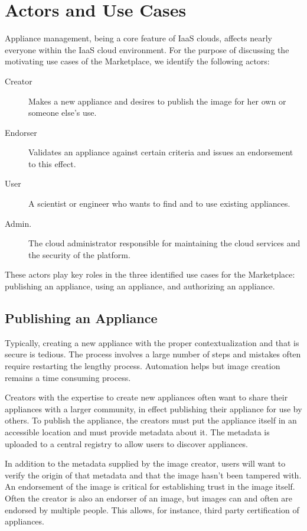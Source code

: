 \section{Actors and Use Cases}
\label{sec:usecases}

Appliance management, being a core feature of IaaS clouds, affects
nearly everyone within the IaaS cloud environment.  For the purpose of
discussing the motivating use cases of the Marketplace, we identify
the following actors:
\begin{description}
\item[Creator] Makes a new appliance and desires to publish the image
  for her own or someone else's use.
\item[Endorser] Validates an appliance against certain criteria and
  issues an endorsement to this effect.
\item[User] A scientist or engineer who wants to find and to use
  existing appliances.
\item[Admin.] The cloud administrator responsible for
  maintaining the cloud services and the security of the platform.
\end{description}
These actors play key roles in the three identified use cases for the
Marketplace: publishing an appliance, using an appliance, and
authorizing an appliance. 

\subsection{Publishing an Appliance}

Typically, creating a new appliance with the proper contextualization
and that is secure is tedious.  The process involves a large number of
steps and mistakes often require restarting the lengthy process.
Automation helps but image creation remains a time consuming process.

Creators with the expertise to create new appliances often want to
share their appliances with a larger community, in effect publishing
their appliance for use by others.  To publish the appliance, the
creators must put the appliance itself in an accessible location and
must provide metadata about it.  The metadata is uploaded to a central
registry to allow users to discover appliances. 

In addition to the metadata supplied by the image creator, users will
want to verify the origin of that metadata and that the image hasn't
been tampered with.  An endorsement of the image is critical for
establishing trust in the image itself.  Often the creator is also an
endorser of an image, but images can and often are endorsed by
multiple people.  This allows, for instance, third party certification
of appliances.


